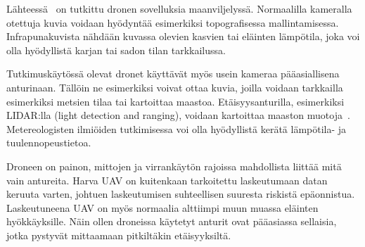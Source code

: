 Lähteessä~\cite{Hogan2017} on tutkittu dronen
sovelluksia maanviljelyssä. Normaalilla kameralla otettuja kuvia voidaan
hyödyntää esimerkiksi topografisessa mallintamisessa. Infrapunakuvista nähdään
kuvassa olevien kasvien tai eläinten lämpötila, joka voi olla hyödyllistä
karjan tai sadon tilan tarkkailussa.

Tutkimuskäytössä olevat dronet käyttävät myös usein kameraa pääasiallisena
anturinaan. Tällöin ne esimerkiksi voivat ottaa kuvia, joilla voidaan tarkkailla
esimerkiksi metsien tilaa tai kartoittaa maastoa. Etäisyysanturilla,
esimerkiksi LIDAR:lla (light detection and ranging), voidaan kartoittaa maaston
muotoja~\cite{Hogan2017}. Metereologisten ilmiöiden tutkimisessa voi olla
hyödyllistä kerätä lämpötila- ja tuulennopeustietoa.

Droneen on painon, mittojen ja virrankäytön rajoissa mahdollista liittää mitä
vain antureita. Harva UAV on kuitenkaan tarkoitettu laskeutumaan datan keruuta
varten, johtuen laskeutumisen suhteellisen suuresta riskistä epäonnistua.
Laskeutuneena UAV on myös normaalia alttiimpi muun muassa eläinten
hyökkäyksille. Näin ollen droneissa käytetyt anturit ovat pääasiassa sellaisia,
jotka pystyvät mittaamaan pitkiltäkin etäisyyksiltä.
